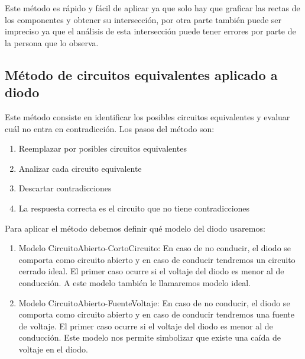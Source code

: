 \documentclass[11pt,fancy,lang=es]{elegantbook}
\begin{document}
Este método es rápido y fácil de aplicar ya que solo hay que graficar las rectas de los componentes y obtener su intersección, por otra parte también puede ser impreciso ya que el análisis de esta intersección puede tener errores por parte de la persona que lo observa.






\subsection{Método de circuitos equivalentes aplicado a diodo}
\begin{remark}
    Este método consiste en identificar los posibles circuitos equivalentes y evaluar cuál no entra en contradicción. Los pasos del método son:
    \begin{enumerate}
        \item Reemplazar por posibles circuitos equivalentes
        \item Analizar cada circuito equivalente
        \item Descartar contradicciones
        \item La respuesta correcta es el circuito que no tiene contradicciones

    \end{enumerate}
\end{remark}

Para aplicar el método debemos definir qué modelo del diodo usaremos:
\begin{enumerate}
    \item Modelo CircuitoAbierto-CortoCircuito: En caso de no conducir, el diodo se comporta como circuito abierto y en caso de conducir tendremos un circuito cerrado ideal. El primer caso ocurre si el voltaje del diodo es menor al de conducción. A este modelo también le llamaremos modelo ideal.
    \item Modelo CircuitoAbierto-FuenteVoltaje: En caso de no conducir, el diodo se comporta como circuito abierto y en caso de conducir tendremos una fuente de voltaje. El primer caso ocurre si el voltaje del diodo es menor al de conducción. Este modelo nos permite simbolizar que existe una caída de voltaje en el diodo.
\end{enumerate}
\end{document}

